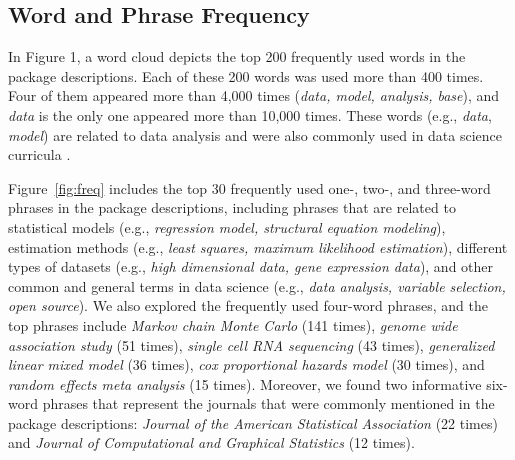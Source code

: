 \subsection{Word and Phrase Frequency}

In Figure 1, a word cloud depicts the top 200 frequently used words in the package descriptions. Each of these 200 words was used more than 400 times. Four of them appeared more than 4,000 times ({\it data, model, analysis, base}), and {\it data} is the only one appeared more than 10,000 times. These words (e.g., {\it data}, {\it model}) are related to data analysis and were also commonly used in data science curricula \citep{zhang2021data}. 



Figure~\ref{fig:freq} includes the top 30 frequently used one-, two-, and three-word phrases in the package descriptions, including phrases that are related to statistical models (e.g., {\it regression model, structural equation modeling}), estimation methods (e.g., {\it least squares, maximum likelihood estimation}), different types of datasets (e.g., {\it high dimensional data, gene expression data}), and other common and general terms in data science (e.g., {\it data analysis, variable selection, open source}). We also explored the frequently used four-word phrases, and the top phrases include {\it Markov chain Monte Carlo} (141 times), {\it genome wide association study} (51 times), {\it single cell RNA sequencing} (43 times), {\it generalized linear mixed model} (36 times), {\it cox proportional hazards model} (30 times), and {\it random effects meta analysis} (15 times). Moreover, we found two informative six-word phrases that represent the journals that were commonly mentioned in the package descriptions: {\it Journal of the American Statistical Association} (22 times) and {\it Journal of Computational and Graphical Statistics} (12 times).



